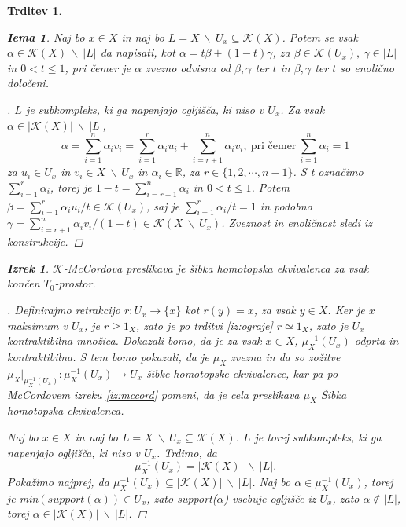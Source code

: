 \documentclass[a4paper,12pt]{article}
\DeclareRobustCommand{\k}{
    \mathcal{K}
}
\theoremstyle{definition}
\theoremstyle{plain}
\newtheorem{izrek}{Izrek}
\theoremstyle{definition}
\theoremstyle{plain}
\newtheorem{trditev}{Trditev}
\theoremstyle{plain}
\theoremstyle{plain}
\theoremstyle{plain}
\newtheorem{lema}{Iema}
\newenvironment{dokaz}{\begin{proof}[\bfseries\upshape\proofname]}{\end{proof}}
\begin{document}
\begin{trditev}
\begin{lema}\label{lem:sibka}
    Naj bo $x\in X$ in naj bo $L=X\ \backslash \
    U_x\subseteq \mathcal{K}(X)$. Potem se vsak $\alpha \in \k(X)\ \backslash \ |L|$ da napisati, kot $\alpha = t\beta + (1-t)\gamma$, za $\beta \in \k(U_x), \ \gamma \in |L|$ in $0<t\leq 1$, pri čemer je $\alpha$ zvezno odvisna od $\beta, \gamma$ ter $t$ in $\beta, \gamma$ ter $t$ so enolično določeni.
\end{lema}
\begin{dokaz}
    $L$ je subkompleks, ki ga napenjajo ogljišča, ki niso v $U_x$. Za vsak $\alpha \in |\k(X)|\ \backslash \ |L|$, 
    $$\alpha = \sum_{i=1}^{n} \alpha_i v_i 
    = \sum_{i=1}^{r} \alpha_i u_i + \sum_{i=r+1}^{n}\alpha_i v_i,\ \text{pri čemer}\ \sum_{i=1}^{n} \alpha_i=1
    $$
    za $u_i \in U_x$ in $v_i \in X \ \backslash \ U_x$ in $\alpha_i \in \mathbb{R}$, za $r\in \{1,2, \cdots, n-1\}$. S t označimo $\sum_{i=1}^{r} \alpha_i$, torej je $1-t=\sum_{i=r+1}^{n} \alpha_i$ in $0<t\leq 1$. Potem $\beta =\sum_{i=1}^{r} \alpha_i u_i/t \in \k(U_x)$, saj je $\sum_{i=1}^{r} \alpha_i/t=1$ in podobno $\gamma=\sum_{i=r+1}^{n} 
    \alpha_i v_i/(1-t) \in \k(X \ \backslash \ U_x)$. Zveznost in enoličnost sledi iz konstrukcije.

\end{dokaz}

\begin{izrek}
    $\mathcal{K}$-\textit{McCordova} preslikava je šibka homotopska 
    ekvivalenca za vsak končen $T_0$-prostor.
\end{izrek}

\begin{dokaz}
    Definirajmo retrakcijo $r:U_x\rightarrow \{x\}$ kot 
    $r(y)=x$, za vsak $y\in X$. Ker je $x$ maksimum v 
    $U_x$, je $r\geq 1_X$, zato je po trditvi 
    \ref{iz:ograje} $r\simeq 1_X$, zato je $U_x$ 
    kontraktibilna množica. Dokazali bomo, da je za vsak 
    $x\in X$, $\mu_X^{-1}(U_x)$ odprta in kontraktibilna. S 
    tem bomo pokazali, da je $\mu_X$ zvezna in da so 
    zožitve $\mu_X|_{\mu_X^{-1}(U_x)}:\mu_X^{-1}(U_x)\rightarrow 
    U_x$ šibke homotopske ekvivalence, kar pa po McCordovem izreku \ref*{iz:mccord}
    pomeni, da je cela preslikava $\mu_X$ Šibka homotopska ekvivalenca.

    Naj bo $x\in X$ in naj bo $L=X\ \backslash \
    U_x\subseteq \mathcal{K}(X)$. $L$ je torej 
    subkompleks, ki ga napenjajo ogljišča, ki niso v $U_x$. 
    Trdimo, da 
    $$
    \mu_X^{-1}(U_x)=|\mathcal{K}(X)|\ \backslash \ |L|.
    $$
    Pokažimo najprej, da $\mu_X^{-1}(U_x)\subseteq 
    |\mathcal{K}(X)|\ \backslash \ |L|$. Naj bo $\alpha \in 
    \mu_X^{-1}(U_x)$, torej je min$(\textit{support}
    (\alpha))\in U_x$, zato \textit{support}($\alpha$) vsebuje 
    ogljišče iz $U_x$, zato $\alpha \notin |L|$, torej $\alpha 
    \in |\mathcal{K}(X)|\ \backslash \ |L|$.


\end{dokaz}
\end{trditev}
\end{document}
